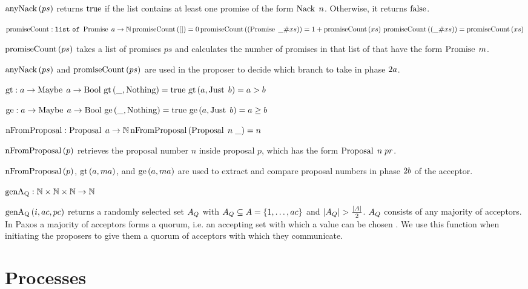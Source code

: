 $\operatorname{anyNack}\left(ps\right)$ returns $\operatorname{true}$ if the list contains at least one promise of the form $\operatorname{Nack}\; n$.
Otherwise, it returns $\operatorname{false}$.

$\operatorname{promiseCount} : \mathtt{list\ of\ } \operatorname{Promise}\; a \to \mathbb{N}\\
\operatorname{promiseCount}\left(\mathtt{[]}\right) = 0\\
\operatorname{promiseCount}\left(\left(\operatorname{Promise}\; \mathtt{\_} \mathtt{\#} xs\right)\right) = 1 + \operatorname{promiseCount}\left(xs\right)\\
\operatorname{promiseCount}\left(\left(\mathtt{\_} \mathtt{\#} xs\right)\right) = \operatorname{promiseCount}\left(xs\right)$

$\operatorname{promiseCount}\left(ps\right)$ takes a list of promises $ps$ and calculates the number of promises in that list of that have the form $\operatorname{Promise}\; m$.

$\operatorname{anyNack}\left(ps\right)$ and $\operatorname{promiseCount}\left(ps\right)$ are used in the proposer to decide which branch to take in phase $2a$.

$\operatorname{gt}: a \to \operatorname{Maybe}\; a \to \operatorname{Bool}\\
\operatorname{gt}\left(\mathtt{\_}, \operatorname{Nothing}\right) = \operatorname{true}\\
\operatorname{gt}\left(a, \operatorname{Just}\; b\right) = a > b$

$\operatorname{ge}: a \to \operatorname{Maybe}\; a \to \operatorname{Bool}\\
\operatorname{ge}\left(\mathtt{\_}, \operatorname{Nothing}\right) = \operatorname{true}\\
\operatorname{ge}\left(a, \operatorname{Just}\; b\right) = a \ge b$

$\operatorname{nFromProposal} : \operatorname{Proposal}\; a \to \mathbb{N}\\
\operatorname{nFromProposal}\left(\operatorname{Proposal}\; n\; \mathtt{\_} \right) = n$

$\operatorname{nFromProposal}\left(p \right)$ retrieves the proposal number $n$ inside proposal $p$, which has the form $\operatorname{Proposal}\; n\; pr$.

$\operatorname{nFromProposal}\left(p \right)$, $\operatorname{gt}\left(a, ma\right)$, and $\operatorname{ge}\left(a, ma\right)$ are used to extract and compare proposal numbers in phase $2b$ of the acceptor.

$\operatorname{genA_Q} : \mathbb{N} \times \mathbb{N} \times \mathbb{N} \to \mathbb{N}$

$\operatorname{genA_Q}\left(i, ac, pc\right)$ returns a randomly selected set $A_Q$ with $A_Q \subseteq A = \left\{1, \dots, ac\right\}$ and $|A_Q| > \frac{|A|}{2}$.
$A_Q$ consists of any majority of acceptors.
In Paxos a majority of acceptors forms a quorum, i.e. an accepting set with which a value can be chosen \cite{lower_bounds}.
We use this function when initiating the proposers to give them a quorum of acceptors with which they communicate.

\section{Processes}
